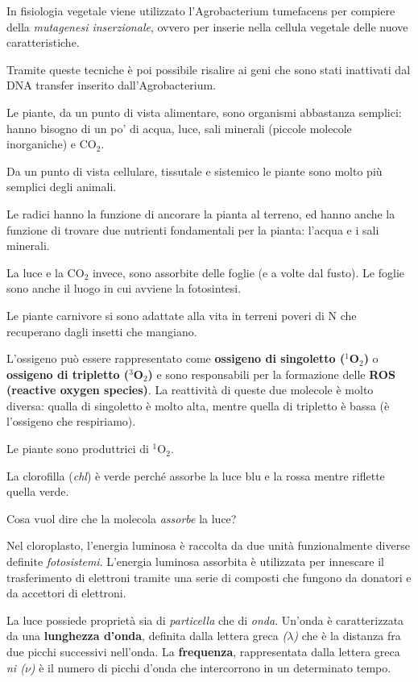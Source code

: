 \documentclass[]{article}
\begin{document}
In fisiologia vegetale viene utilizzato l'Agrobacterium tumefacens per
compiere della \emph{mutagenesi inserzionale}, ovvero per inserie nella
cellula vegetale delle nuove caratteristiche.

Tramite queste tecniche è poi possibile risalire ai geni che sono stati
inattivati dal DNA transfer inserito dall'Agrobacterium.

Le piante, da un punto di vista alimentare, sono organismi abbastanza
semplici: hanno bisogno di un po' di acqua, luce, sali minerali (piccole
molecole inorganiche) e CO$_2$.

Da un punto di vista cellulare, tissutale e sistemico le piante sono
molto più semplici degli animali.

Le radici hanno la funzione di ancorare la pianta al terreno, ed hanno
anche la funzione di trovare due nutrienti fondamentali per la pianta:
l'acqua e i sali minerali.

La luce e la CO$_2$ invece, sono assorbite delle foglie (e a volte dal
fusto). Le foglie sono anche il luogo in cui avviene la fotosintesi.

Le piante carnivore si sono adattate alla vita in terreni poveri di N
che recuperano dagli insetti che mangiano.

L'ossigeno può essere rappresentato come \textbf{ossigeno di singoletto
($^1$O$_2$)} o \textbf{ossigeno di tripletto ($^3$O$_2$)} e sono
responsabili per la formazione delle \textbf{ROS (reactive oxygen
species)}. La reattività di queste due molecole è molto diversa: qualla
di singoletto è molto alta, mentre quella di tripletto è bassa (è
l'ossigeno che respiriamo).

Le piante sono produttrici di $^1$O$_2$.

La clorofilla (\emph{chl}) è verde perché assorbe la luce blu e la rossa
mentre riflette quella verde.

Cosa vuol dire che la molecola \emph{assorbe} la luce?

Nel cloroplasto, l'energia luminosa è raccolta da due unità
funzionalmente diverse definite \emph{fotosistemi}. L'energia luminosa
assorbita è utilizzata per innescare il trasferimento di elettroni
tramite una serie di composti che fungono da donatori e da accettori di
elettroni.

La luce possiede proprietà sia di \emph{particella} che di \emph{onda}.
Un'onda è caratterizzata da una \textbf{lunghezza d'onda}, definita
dalla lettera greca \emph{($\lambda$)} che è la distanza fra due picchi
successivi nell'onda. La \textbf{frequenza}, rappresentata dalla lettera
greca \emph{ni ($\nu$)} è il numero di picchi d'onda che intercorrono in
un determinato tempo.
\end{document}
